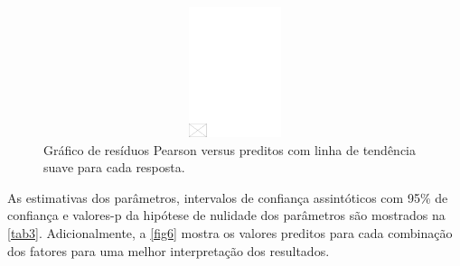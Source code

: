 \documentclass[AMA,STIX1COL]{WileyNJD-v2}
\begin{document}
\begin{figure}[h]
\centerline{\includegraphics[width=342pt,height=9pc,draft]{empty}}
\caption{Gráfico de resíduos Pearson versus preditos com linha de tendência suave para cada resposta.\label{fig5}}
\end{figure}

As estimativas dos parâmetros, intervalos de confiança assintóticos com 95\% de confiança e valores-p da hipótese de nulidade dos parâmetros são mostrados na \autoref{tab3}. Adicionalmente, a \autoref{fig6} mostra os valores preditos para cada combinação dos fatores para uma melhor interpretação dos resultados.
\end{document}

